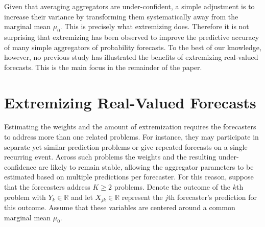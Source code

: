 \documentclass[11pt]{article}
\theoremstyle{definition}
\theoremstyle{definition}
\begin{document}


Given that averaging aggregators are under-confident, a simple adjustment is to  increase their variance by transforming them systematically away from the marginal mean $\mu_0$. This is precisely what extremizing does. Therefore it is not surprising that extremizing has been observed to improve the predictive accuracy of many simple aggregators of  probability forecasts. To the best of our knowledge, however,  no previous study has illustrated the benefits of extremizing real-valued forecasts. This is the main focus in the remainder of the paper.



\section{Extremizing Real-Valued Forecasts} \label{extremization}

Estimating the weights and the amount of extremization requires the forecasters to address more than one related problems. For instance, they may participate in separate yet similar prediction problems or give repeated forecasts on a single recurring event. Across such problems the weights and the resulting under-confidence are likely to remain stable, allowing the aggregator parameters to be estimated based on multiple predictions per forecaster. For this reason, suppose that the forecasters address $K \geq 2$ problems. Denote the outcome of the $k$th problem with $Y_k \in \mathbb{R}$ and let $X_{jk} \in \mathbb{R}$ represent the $j$th forecaster's prediction for this outcome. Assume that these variables are centered around a common marginal mean $\mu_0$.  
\end{document}
